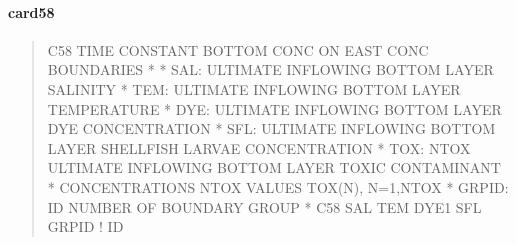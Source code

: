 \documentclass[letterpaper,10pt,english]{sphinxmanual}
\begin{document}
\paragraph{card58}
\label{\detokenize{inputfiles/runcontrol/card58:card58}}\label{\detokenize{inputfiles/runcontrol/card58::doc}}\begin{quote}

\begin{sphinxVerbatim}[commandchars=\\\{\}]
\PYGZhy{}\PYGZhy{}\PYGZhy{}\PYGZhy{}\PYGZhy{}\PYGZhy{}\PYGZhy{}\PYGZhy{}\PYGZhy{}\PYGZhy{}\PYGZhy{}\PYGZhy{}\PYGZhy{}\PYGZhy{}\PYGZhy{}\PYGZhy{}\PYGZhy{}\PYGZhy{}\PYGZhy{}\PYGZhy{}\PYGZhy{}\PYGZhy{}\PYGZhy{}\PYGZhy{}\PYGZhy{}\PYGZhy{}\PYGZhy{}\PYGZhy{}\PYGZhy{}\PYGZhy{}\PYGZhy{}\PYGZhy{}\PYGZhy{}\PYGZhy{}\PYGZhy{}\PYGZhy{}\PYGZhy{}\PYGZhy{}\PYGZhy{}\PYGZhy{}\PYGZhy{}\PYGZhy{}\PYGZhy{}\PYGZhy{}\PYGZhy{}\PYGZhy{}\PYGZhy{}\PYGZhy{}\PYGZhy{}\PYGZhy{}\PYGZhy{}\PYGZhy{}\PYGZhy{}\PYGZhy{}\PYGZhy{}\PYGZhy{}\PYGZhy{}\PYGZhy{}\PYGZhy{}\PYGZhy{}\PYGZhy{}\PYGZhy{}\PYGZhy{}\PYGZhy{}\PYGZhy{}\PYGZhy{}\PYGZhy{}\PYGZhy{}\PYGZhy{}\PYGZhy{}\PYGZhy{}\PYGZhy{}\PYGZhy{}\PYGZhy{}\PYGZhy{}\PYGZhy{}\PYGZhy{}\PYGZhy{}
C58 TIME CONSTANT BOTTOM CONC ON EAST CONC BOUNDARIES
*
*    SAL: ULTIMATE INFLOWING BOTTOM LAYER SALINITY
*    TEM: ULTIMATE INFLOWING BOTTOM LAYER TEMPERATURE
*    DYE: ULTIMATE INFLOWING BOTTOM LAYER DYE CONCENTRATION
*    SFL: ULTIMATE INFLOWING BOTTOM LAYER SHELLFISH LARVAE CONCENTRATION
*    TOX: NTOX ULTIMATE INFLOWING BOTTOM LAYER TOXIC CONTAMINANT
*         CONCENTRATIONS NTOX VALUES TOX(N), N=1,NTOX
*  GRPID: ID NUMBER OF BOUNDARY GROUP
*
C58       SAL       TEM      DYE1       SFL      GRPID ! ID
\end{sphinxVerbatim}
\end{quote}
\end{document}
